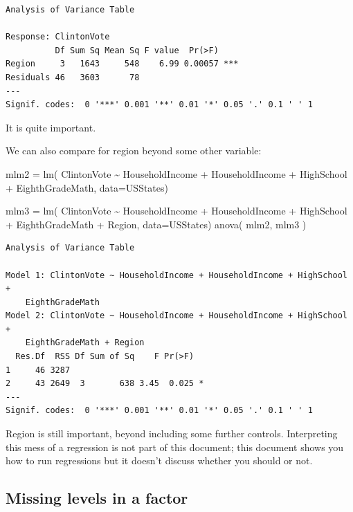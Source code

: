 \documentclass[
  letterpaper,
  DIV=11,
  numbers=noendperiod]{scrreprt}
\newenvironment{Shaded}{\begin{snugshade}}{\end{snugshade}}
\newcommand{\AttributeTok}[1]{\textcolor[rgb]{0.49,0.56,0.16}{#1}}
\newcommand{\FunctionTok}[1]{\textcolor[rgb]{0.02,0.16,0.49}{#1}}
\newcommand{\NormalTok}[1]{\textcolor[rgb]{0.00,0.44,0.13}{#1}}
\newcommand{\OtherTok}[1]{\textcolor[rgb]{0.00,0.44,0.13}{#1}}
\newcommand{\SpecialCharTok}[1]{\textcolor[rgb]{0.25,0.44,0.63}{#1}}
\begin{document}
\begin{verbatim}
Analysis of Variance Table

Response: ClintonVote
          Df Sum Sq Mean Sq F value  Pr(>F)    
Region     3   1643     548    6.99 0.00057 ***
Residuals 46   3603      78                    
---
Signif. codes:  0 '***' 0.001 '**' 0.01 '*' 0.05 '.' 0.1 ' ' 1
\end{verbatim}

It is quite important.

We can also compare for region beyond some other variable:

\begin{Shaded}
\begin{Highlighting}[]
\NormalTok{mlm2 }\OtherTok{=} \FunctionTok{lm}\NormalTok{( ClintonVote }\SpecialCharTok{\textasciitilde{}}\NormalTok{ HouseholdIncome }\SpecialCharTok{+}\NormalTok{ HouseholdIncome }\SpecialCharTok{+}\NormalTok{ HighSchool }\SpecialCharTok{+} 
\NormalTok{               EighthGradeMath, }\AttributeTok{data=}\NormalTok{USStates)}

\NormalTok{mlm3 }\OtherTok{=} \FunctionTok{lm}\NormalTok{( ClintonVote }\SpecialCharTok{\textasciitilde{}}\NormalTok{ HouseholdIncome }\SpecialCharTok{+}\NormalTok{ HouseholdIncome }\SpecialCharTok{+}\NormalTok{ HighSchool }\SpecialCharTok{+} 
\NormalTok{               EighthGradeMath }\SpecialCharTok{+}\NormalTok{ Region, }\AttributeTok{data=}\NormalTok{USStates)}
\FunctionTok{anova}\NormalTok{( mlm2, mlm3 )}
\end{Highlighting}
\end{Shaded}

\begin{verbatim}
Analysis of Variance Table

Model 1: ClintonVote ~ HouseholdIncome + HouseholdIncome + HighSchool + 
    EighthGradeMath
Model 2: ClintonVote ~ HouseholdIncome + HouseholdIncome + HighSchool + 
    EighthGradeMath + Region
  Res.Df  RSS Df Sum of Sq    F Pr(>F)  
1     46 3287                           
2     43 2649  3       638 3.45  0.025 *
---
Signif. codes:  0 '***' 0.001 '**' 0.01 '*' 0.05 '.' 0.1 ' ' 1
\end{verbatim}

Region is still important, beyond including some further controls.
Interpreting this mess of a regression is not part of this document;
this document shows you how to run regressions but it doesn't discuss
whether you should or not.

\hypertarget{missing-levels-in-a-factor}{%
\subsection{Missing levels in a
factor}\label{missing-levels-in-a-factor}}
\end{document}
